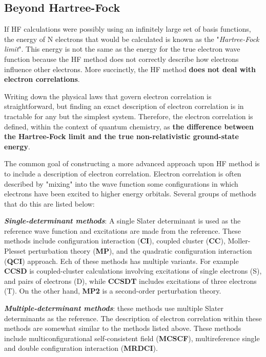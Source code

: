\documentclass[12pt]{article}
\begin{document}
\subsection{Beyond Hartree-Fock}
If HF calculations were possibly using an infinitely large set of basis functions, the energy of N electrons that would be calculated is known as the "\textit{Hartree-Fock limit}". This energy is not the same as the energy for the true electron wave function because the HF method does not correctly describe how electrons influence other electrons. More succinctly, the HF method \textbf{does not deal with electron correlations}.

Writing down the physical laws that govern electron correlation is straightforward, but finding an exact description of electron correlation is in tractable for any but the simplest system. Therefore, the electron correlation is defined, within the context of quantum chemistry, as \textbf{the difference between the Hartree-Fock limit and the true non-relativistic ground-state energy}.

The common goal of constructing a more advanced approach upon HF method is to include a description of electron correlation. Electron correlation is often described by "mixing" into the wave function some configurations in which electrons have been excited to higher energy orbitals. Several groups of methods that do this are listed below:

\textbf{\emph{Single-determinant methods}}: A single Slater determinant is used as the reference wave function and excitations are made from the reference. These methods include configuration interaction (\textbf{CI}), coupled cluster (\textbf{CC}), Moller-Plesset perturbation theory (\textbf{MP}), and the quadratic configuration interaction (\textbf{QCI}) approach. Ech of these methods has multiple variants. For example \textbf{CCSD} is coupled-cluster calculations involving excitations of single electrons (S), and pairs of electrons (D), while \textbf{CCSDT} includes excitations of three electrons (T). On the other hand, \textbf{MP2} is a second-order perturbation theory.

\textbf{\emph{Multiple-determinant methods}}: these methods use multiple Slater determinants as the reference. The description of electron correlation within these methods are somewhat similar to the methods listed above. These methods include multiconfigurational self-consistent field (\textbf{MCSCF}), multireference single and double configuration interaction (\textbf{MRDCI}).
\end{document}
